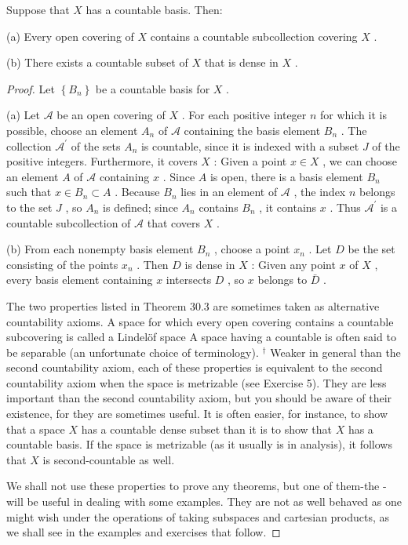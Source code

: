 \begin{theorem}
	Suppose that \(X\) has a countable basis. Then:

(a) Every open covering of \(X\) contains a countable subcollection covering \(X\) .

(b) There exists a countable subset of \(X\) that is dense in \(X\) .

\end{theorem}
\begin{proof}
Let \(\left\{  {B}_{n}\right\}\) be a countable basis for \(X\) .

(a) Let \(\mathcal{A}\) be an open covering of \(X\) . For each positive integer \(n\) for which it is possible, choose an element \({A}_{n}\) of \(\mathcal{A}\) containing the basis element \({B}_{n}\) . The collection \({\mathcal{A}}^{\prime }\) of the sets \({A}_{n}\) is countable, since it is indexed with a subset \(J\) of the positive integers. Furthermore, it covers \(X\) : Given a point \(x \in  X\) , we can choose an element \(A\) of \(\mathcal{A}\) containing \(x\) . Since \(A\) is open, there is a basis element \({B}_{n}\) such that \(x \in  {B}_{n} \subset  A\) . Because \({B}_{n}\) lies in an element of \(\mathcal{A}\) , the index \(n\) belongs to the set \(J\) , so \({A}_{n}\) is defined; since \({A}_{n}\) contains \({B}_{n}\) , it contains \(x\) . Thus \({\mathcal{A}}^{\prime }\) is a countable subcollection of \(\mathcal{A}\) that covers \(X\) .

(b) From each nonempty basis element \({B}_{n}\) , choose a point \({x}_{n}\) . Let \(D\) be the set consisting of the points \({x}_{n}\) . Then \(D\) is dense in \(X\) : Given any point \(x\) of \(X\) , every basis element containing \(x\) intersects \(D\) , so \(x\) belongs to \(\bar{D}\) .

The two properties listed in Theorem 30.3 are sometimes taken as alternative countability axioms. A space for which every open covering contains a countable subcovering is called a Lindelöf space A space having a countable  is often said to be  separable (an unfortunate choice of terminology). ${}^{\dagger}$ Weaker in general than the second countability axiom, each of these properties is equivalent to the second countability axiom when the space is metrizable (see Exercise 5). They are less important than the second countability axiom, but you should be aware of their existence, for they are sometimes useful. It is often easier, for instance, to show that a space \(X\) has a countable dense subset than it is to show that \(X\) has a countable basis. If the space is metrizable (as it usually is in analysis), it follows that \(X\) is second-countable as well.

We shall not use these properties to prove any theorems, but one of them-the -will be useful in dealing with some examples. They are not as well behaved as one might wish under the operations of taking subspaces and cartesian products, as we shall see in the examples and exercises that follow.
\end{proof}

